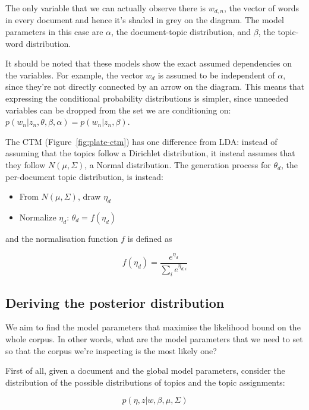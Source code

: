 \documentclass[12pt,a4paper,twoside,openright]{report}
\begin{document}
The only variable that we can actually observe there is $w_{d, n}$, the vector of words in every document and hence it's shaded in grey on the diagram. The model parameters in this case are $\alpha$, the document-topic distribution, and $\beta$, the topic-word distribution.

It should be noted that these models show the exact assumed dependencies on the variables. For example, the vector $w_d$ is assumed to be independent of $\alpha$, since they're not directly connected by an arrow on the diagram. This means that expressing the conditional probability distributions is simpler, since unneeded variables can be dropped from the set we are conditioning on: $p(w_n | z_n, \theta, \beta, \alpha) = p(w_n | z_n, \beta)$.

The CTM (Figure~\ref{fig:plate-ctm}) has one difference from LDA: instead of assuming that the topics follow a Dirichlet distribution, it instead assumes that they follow $N(\mu, \Sigma)$, a Normal distribution. The generation process for $\theta_d$, the per-document topic distribution, is instead:

\begin{itemize}[noitemsep]
\item From $N(\mu, \Sigma)$, draw $\eta_d$
\item Normalize $\eta_d$: $\theta_d = f(\eta_d) $
\end{itemize}

and the normalisation function $f$ is defined as 

\begin{equation}
f(\eta_d) = \frac{e^{\eta_d}}{\sum\limits_i e^{\eta_{d, i}}}
\end{equation}

\subsection{Deriving the posterior distribution}

We aim to find the model parameters that maximise the likelihood bound on the whole corpus. In other words, what are the model parameters that we need to set so that the corpus we're inspecting is the most likely one?

First of all, given a document and the global model parameters, consider the distribution of the possible distributions of topics and the topic assignments:

\begin{equation}
p(\eta, z | w, \beta, \mu, \Sigma)
\end{equation}
\end{document}
